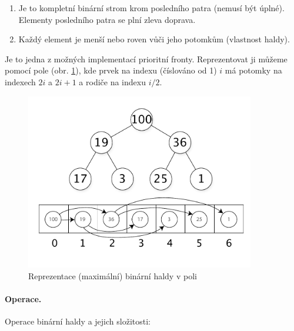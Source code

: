\begin{enumerate}[itemsep=0pt, topsep=2pt]
    \item Je to kompletní binární strom krom posledního patra (nemusí být úplné). Elementy posledního patra se plní zleva doprava.
    \item Každý element je menší nebo roven vůči jeho potomkům (vlastnost haldy).
\end{enumerate}

\noindent Je to jedna z možných implementací prioritní fronty. Reprezentovat ji můžeme pomocí pole (obr. \ref{fig:heap_array_representation}), kde prvek na indexu (číslováno od 1) $i$ má potomky na indexech $2i$ a $2i + 1$ a rodiče na indexu $i/2$.

\begin{figure}[htbp]
    \begin{center}
        \vspace{-20px}
        \includegraphics[width=100mm]{01/images/Max-Heap}
        \vspace{-20px}
        \caption{Reprezentace (maximální) binární haldy v poli}
        \label{fig:heap_array_representation}
        \vspace{-20px}
    \end{center}
\end{figure}

\paragraph{Operace.} Operace binární haldy a jejich složitosti:

